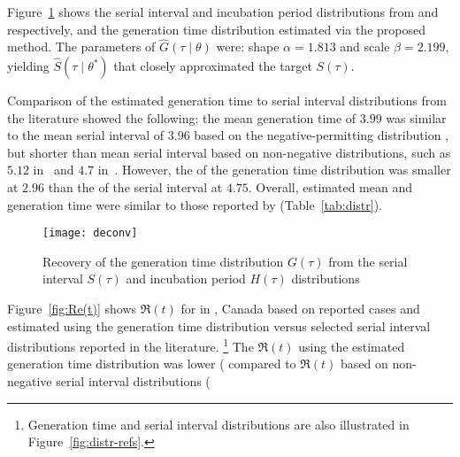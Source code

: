 Figure~\ref{fig:deconv} shows the
serial interval and incubation period distributions
from \cite{Du2020} and \cite{Lauer2020} respectively,
and the generation time distribution estimated via the proposed method.  %
The \mle parameters of $\hat{G}(\tau\mid\theta)$ were:
shape ${\alpha = 1.813}$ and scale ${\beta = 2.199}$,
yielding $\hat{S}(\tau\mid\theta^*)$ that closely approximated
the target $S(\tau)$.
\par
Comparison of the estimated generation time to serial interval distributions from the literature 
showed the following: the mean generation time of $3.99$ was similar to
the mean serial interval of $3.96$
based on the negative-permitting distribution \cite{Du2020},
but shorter than mean serial interval based on non-negative distributions,
such as $5.12$ in~\cite{Zhang2020} and $4.7$ in~\cite{Nishiura2020}.  %
However, the \sd of the generation time distribution was smaller at $2.96$
than the \sd of the serial interval at $4.75$.   %
Overall, estimated mean and \sd generation time
were similar to those reported by \textcite{Ganyani2020}  %
(Table~\ref{tab:distr}).
\par
\begin{figure}
  \centering
  \texttt{[image: deconv]}
  \caption{Recovery of the generation time distribution $G(\tau)$
    from the serial interval $S(\tau)$
    and incubation period $H(\tau)$ distributions}
  \label{fig:deconv}
\end{figure}
\par
Figure~\ref{fig:Re(t)} shows  %
$\Re(t)$ for \covid in \gta, Canada
based on reported cases and estimated using
the generation time distribution versus
selected serial interval distributions reported in the literature.%
\footnote{Generation time and serial interval distributions
  are also illustrated in Figure~\ref{fig:distr-refs}.}
The $\Re(t)$ using the estimated generation time distribution
was lower (%
compared to $\Re(t)$ based on non-negative serial interval distributions (%
